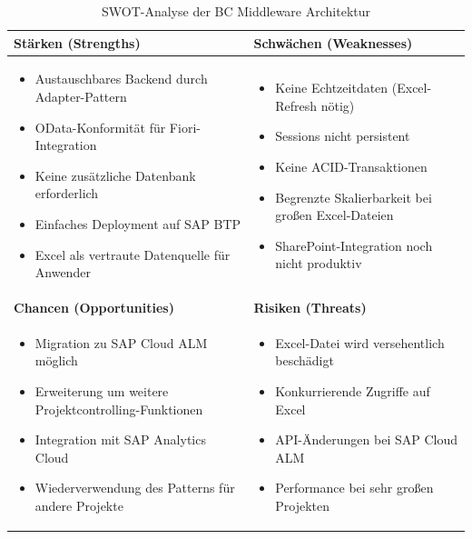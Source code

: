 \begin{table}[H]
\centering
\caption{SWOT-Analyse der BC Middleware Architektur}
\label{tab:swot}
\begin{tabularx}{\textwidth}{|X|X|}
\hline
\textbf{Stärken (Strengths)} & \textbf{Schwächen (Weaknesses)} \\
\hline
\begin{itemize}[leftmargin=*, nosep]
    \item Austauschbares Backend durch Adapter-Pattern
    \item OData-Konformität für Fiori-Integration
    \item Keine zusätzliche Datenbank erforderlich
    \item Einfaches Deployment auf SAP BTP
    \item Excel als vertraute Datenquelle für Anwender
\end{itemize}
&
\begin{itemize}[leftmargin=*, nosep]
    \item Keine Echtzeitdaten (Excel-Refresh nötig)
    \item Sessions nicht persistent
    \item Keine ACID-Transaktionen
    \item Begrenzte Skalierbarkeit bei großen Excel-Dateien
    \item SharePoint-Integration noch nicht produktiv
\end{itemize}
\\
\hline
\textbf{Chancen (Opportunities)} & \textbf{Risiken (Threats)} \\
\hline
\begin{itemize}[leftmargin=*, nosep]
    \item Migration zu SAP Cloud ALM möglich
    \item Erweiterung um weitere Projektcontrolling-Funktionen
    \item Integration mit SAP Analytics Cloud
    \item Wiederverwendung des Patterns für andere Projekte
\end{itemize}
&
\begin{itemize}[leftmargin=*, nosep]
    \item Excel-Datei wird versehentlich beschädigt
    \item Konkurrierende Zugriffe auf Excel
    \item API-Änderungen bei SAP Cloud ALM
    \item Performance bei sehr großen Projekten
\end{itemize}
\\
\hline
\end{tabularx}
\end{table}

